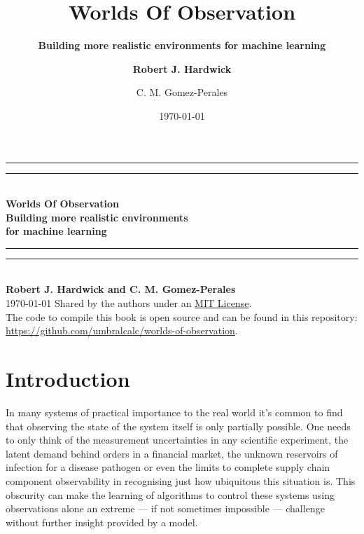 \documentclass{book}
\title{\Huge \bfseries\sffamily Worlds Of Observation}
\subtitle{\Large \bfseries\sffamily \color{gray75} Building more realistic environments for machine learning}
\author{\bfseries\sffamily Robert J. Hardwick  \and C. M. Gomez-Perales}
\date{\today}
\begin{document}
\begin{titlepage}
\centering
\vspace*{1.5\baselineskip}
{\color{gray75}\rule{13cm}{1.3pt}}\vspace*{-\baselineskip}\vspace*{2pt} %
{\color{gray75}\rule{13cm}{0.4pt}} \\ %
\vspace{1.2\baselineskip} %
{\Huge \bfseries\sffamily Worlds Of Observation} \\ 
\vspace{4mm}
{\Large \bfseries\sffamily \color{gray75} Building more realistic environments\\ for machine learning \\}
\vspace*{0.75\baselineskip}
{\color{gray75}\rule{13cm}{0.4pt}}\vspace*{-\baselineskip}\vspace*{2.75pt} %
{\color{gray75}\rule{13cm}{1.3pt}} \\ %
\vspace{1.0\baselineskip} %
{\large \bfseries\sffamily Robert J. Hardwick and C. M. Gomez-Perales \\
\vspace*{1.2\baselineskip}}
\today
\vfill
Shared by the authors under an \href{https://opensource.org/licenses/MIT}{MIT License}.\\ \vspace{1mm}
The code to compile this book is open source and can be found in this repository: \url{https://github.com/umbralcalc/worlds-of-observation}.
\end{titlepage}

\chapter*{Introduction}

In many systems of practical importance to the real world it's common to find that observing the state of the system itself is only partially possible. One needs to only think of the measurement uncertainties in any scientific experiment, the latent demand behind orders in a financial market, the unknown reservoirs of infection for a disease pathogen or even the limits to complete supply chain component observability in recognising just how ubiquitous this situation is. This obscurity can make the learning of algorithms to control these systems using observations alone an extreme --- if not sometimes impossible --- challenge without further insight provided by a model.
\end{document}
